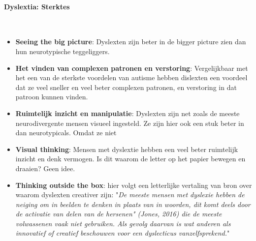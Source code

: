                 \bigskip
                \noindent\paragraph{Dyslextia: Sterktes}\\
                \begin{itemize}
                    \item \textbf{Seeing the big picture}\cite{dyslextia-struggles-and-superpowers}:
                        Dyslexten zijn beter in de bigger picture zien dan hun neurotypische teggeliggers.
                        
                    \item \textbf{Het vinden van complexen patronen en verstoring}\cite{dyslextia-struggles-and-superpowers}:
                        Vergelijkbaar met het een van de sterkste voordelen van autisme hebben dislexten een voordeel dat ze veel sneller en veel beter complexen patronen, en verstoring in dat patroon kunnen vinden.
                        
                    \item \textbf{Ruimtelijk inzicht en manipulatie}\cite{dyslextia-struggles-and-superpowers}:
                        Dyslexten zijn net zoals de meeste neurodivergente mensen visueel ingesteld. Ze zijn hier ook een stuk beter in dan neurotypicals. Omdat ze niet 
                        
                    \item \textbf{Visual thinking}\cite{dyslextia-struggles-and-superpowers}:
                        Mensen met dyslextie hebben een veel beter ruimtelijk inzicht en denk vermogen. Is dit waarom de letter op het papier bewegen en draaien? Geen idee.
                        
                    \item {\textbf{Thinking outside the box}\cite{dyslextia-struggles-and-superpowers}:
                        hier volgt een letterlijke vertaling van bron \cite{Creativity-and-Dyslexia} over waarom dyslexten creativer zijn:
                        {"\textit{De meeste mensen met dyslexie hebben de neiging om in beelden te denken in plaats van in woorden, dit komt deels door de activatie van delen van de hersenen" (Jones, 2016) die de meeste volwassenen vaak niet gebruiken. Als gevolg daarvan is wat anderen als innovatief of creatief beschouwen voor een dyslecticus vanzelfsprekend.}"}
                        }
                \end{itemize}

